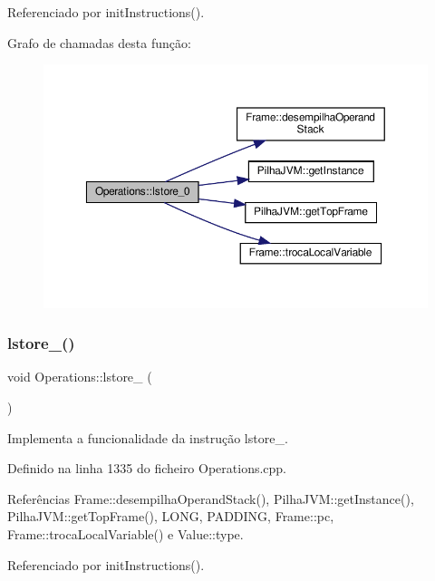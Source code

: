Referenciado por init\+Instructions().

Grafo de chamadas desta função\+:
\nopagebreak
\begin{figure}[H]
\begin{center}
\leavevmode
\includegraphics[width=350pt]{classOperations_ae3c949d56a3ee685668134493595334b_cgraph}
\end{center}
\end{figure}
\mbox{\label{classOperations_aa162cef00367e3d5fb5dca12494a5793}} 
\subsubsection{\texorpdfstring{lstore\+\_()}{lstore\_1()}}
{\footnotesize\ttfamily void Operations\+::lstore\+\_ (\begin{DoxyParamCaption}{ }\end{DoxyParamCaption})\hspace{0.3cm}{\ttfamily [private]}}



Implementa a funcionalidade da instrução lstore\+\_. 



Definido na linha 1335 do ficheiro Operations.\+cpp.



Referências Frame\+::desempilha\+Operand\+Stack(), Pilha\+J\+V\+M\+::get\+Instance(), Pilha\+J\+V\+M\+::get\+Top\+Frame(), L\+O\+NG, P\+A\+D\+D\+I\+NG, Frame\+::pc, Frame\+::troca\+Local\+Variable() e Value\+::type.



Referenciado por init\+Instructions().

